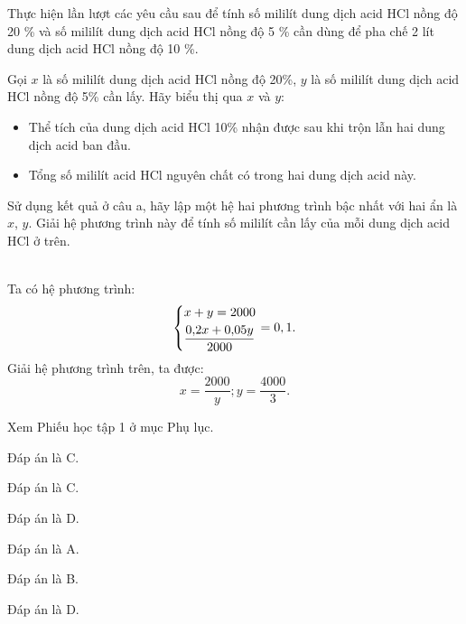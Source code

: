 \begin{vandung}
    Thực hiện lần lượt các yêu cầu sau để tính số mililít dung dịch acid HCl nồng độ 20 \% và số mililít dung dịch acid HCl nồng độ 5 \% cần dùng để pha chế 2 lít dung dịch acid HCl nồng độ 10 \%.
    \begin{listEX}
        \item Gọi $x$ là số mililít dung dịch acid HCl nồng độ 20\%, $y$ là số mililít dung dịch acid HCl nồng độ 5\% cần lấy. Hãy biểu thị qua $x$ và $y$:
        \begin{itemize}
            \item Thể tích của dung dịch acid HCl 10\% nhận được sau khi trộn lẫn hai dung dịch acid ban đầu.
            \item Tổng số mililít acid HCl nguyên chất có trong hai dung dịch acid này.
        \end{itemize}
        \item Sử dụng kết quả ở câu a, hãy lập một hệ hai phương trình bậc nhất với hai ẩn là $x$, $y$. Giải hệ phương trình này để tính số mililít cần lấy của mỗi dung dịch acid HCl ở trên.
    \end{listEX}
    \doicot
    \huongdan\\
    Ta có hệ phương trình:
    $$\left\{\begin{aligned}&x+y=2000\\&\dfrac{0{,}2x+0{,}05y}{2000}\end{aligned}\right.=0,1.$$
    Giải hệ phương trình trên, ta được:
    $$x=\dfrac{2000}{y};y=\dfrac{4000}{3}.$$
\end{vandung}

\begin{phieuhoctap}
	Xem Phiếu học tập 1 ở mục Phụ lục.
	\doicot
	\huongdan
    \begin{ex}
        Đáp án là C.
    \end{ex}
    \begin{ex}
        Đáp án là C.
    \end{ex}
    \begin{ex}
        Đáp án là D.
    \end{ex}
    \begin{ex}
        Đáp án là A.
    \end{ex}
    \begin{ex}
        Đáp án là B.
    \end{ex}
    \begin{ex}
        Đáp án là D.
    \end{ex}
\end{phieuhoctap}

\tochucthuchien

